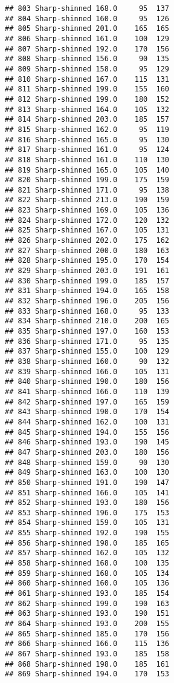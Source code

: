 \documentclass[
]{article}
\begin{document}
\begin{verbatim}
## 803 Sharp-shinned 168.0     95  137
## 804 Sharp-shinned 160.0     95  126
## 805 Sharp-shinned 201.0    165  165
## 806 Sharp-shinned 161.0    100  129
## 807 Sharp-shinned 192.0    170  156
## 808 Sharp-shinned 156.0     90  135
## 809 Sharp-shinned 158.0     95  129
## 810 Sharp-shinned 167.0    115  131
## 811 Sharp-shinned 199.0    155  160
## 812 Sharp-shinned 199.0    180  152
## 813 Sharp-shinned 164.0    105  132
## 814 Sharp-shinned 203.0    185  157
## 815 Sharp-shinned 162.0     95  119
## 816 Sharp-shinned 165.0     95  130
## 817 Sharp-shinned 161.0     95  124
## 818 Sharp-shinned 161.0    110  130
## 819 Sharp-shinned 165.0    105  140
## 820 Sharp-shinned 199.0    175  159
## 821 Sharp-shinned 171.0     95  138
## 822 Sharp-shinned 213.0    190  159
## 823 Sharp-shinned 169.0    105  136
## 824 Sharp-shinned 172.0    120  132
## 825 Sharp-shinned 167.0    105  131
## 826 Sharp-shinned 202.0    175  162
## 827 Sharp-shinned 200.0    180  163
## 828 Sharp-shinned 195.0    170  154
## 829 Sharp-shinned 203.0    191  161
## 830 Sharp-shinned 199.0    185  157
## 831 Sharp-shinned 194.0    165  158
## 832 Sharp-shinned 196.0    205  156
## 833 Sharp-shinned 168.0     95  133
## 834 Sharp-shinned 210.0    200  165
## 835 Sharp-shinned 197.0    160  153
## 836 Sharp-shinned 171.0     95  135
## 837 Sharp-shinned 155.0    100  129
## 838 Sharp-shinned 160.0     90  132
## 839 Sharp-shinned 166.0    105  131
## 840 Sharp-shinned 190.0    180  156
## 841 Sharp-shinned 166.0    110  139
## 842 Sharp-shinned 197.0    165  159
## 843 Sharp-shinned 190.0    170  154
## 844 Sharp-shinned 162.0    100  131
## 845 Sharp-shinned 194.0    155  156
## 846 Sharp-shinned 193.0    190  145
## 847 Sharp-shinned 203.0    180  156
## 848 Sharp-shinned 159.0     90  130
## 849 Sharp-shinned 163.0    100  130
## 850 Sharp-shinned 191.0    190  147
## 851 Sharp-shinned 166.0    105  141
## 852 Sharp-shinned 193.0    180  156
## 853 Sharp-shinned 196.0    175  153
## 854 Sharp-shinned 159.0    105  131
## 855 Sharp-shinned 192.0    190  155
## 856 Sharp-shinned 198.0    185  165
## 857 Sharp-shinned 162.0    105  132
## 858 Sharp-shinned 168.0    100  135
## 859 Sharp-shinned 168.0    105  134
## 860 Sharp-shinned 160.0    105  136
## 861 Sharp-shinned 193.0    185  154
## 862 Sharp-shinned 199.0    190  163
## 863 Sharp-shinned 193.0    190  151
## 864 Sharp-shinned 193.0    200  155
## 865 Sharp-shinned 185.0    170  156
## 866 Sharp-shinned 166.0    115  136
## 867 Sharp-shinned 193.0    185  158
## 868 Sharp-shinned 198.0    185  161
## 869 Sharp-shinned 194.0    170  153

\end{verbatim}
\end{document}
